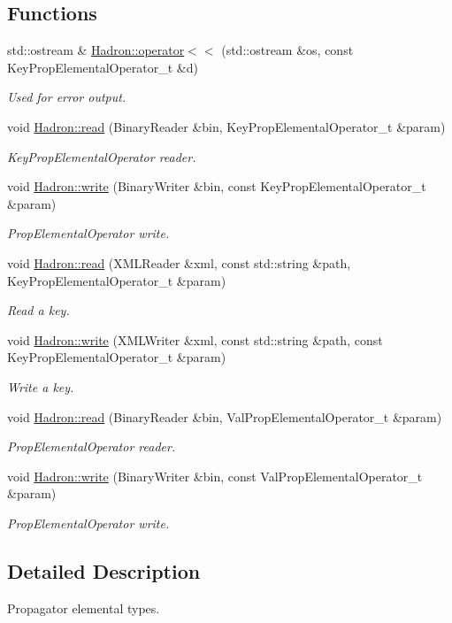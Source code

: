 \subsection*{Functions}
\begin{DoxyCompactItemize}
\item 
std\+::ostream \& \mbox{\hyperlink{namespaceHadron_a8fafc13cc7955fdf6c70c8c72c7b0000}{Hadron\+::operator$<$$<$}} (std\+::ostream \&os, const Key\+Prop\+Elemental\+Operator\+\_\+t \&d)
\begin{DoxyCompactList}\small\item\em Used for error output. \end{DoxyCompactList}\item 
void \mbox{\hyperlink{namespaceHadron_ac7fbe05fdb59de181eed9428364667e3}{Hadron\+::read}} (Binary\+Reader \&bin, Key\+Prop\+Elemental\+Operator\+\_\+t \&param)
\begin{DoxyCompactList}\small\item\em Key\+Prop\+Elemental\+Operator reader. \end{DoxyCompactList}\item 
void \mbox{\hyperlink{namespaceHadron_a2d77dd144d88ef6a060cca397fb32373}{Hadron\+::write}} (Binary\+Writer \&bin, const Key\+Prop\+Elemental\+Operator\+\_\+t \&param)
\begin{DoxyCompactList}\small\item\em Prop\+Elemental\+Operator write. \end{DoxyCompactList}\item 
void \mbox{\hyperlink{namespaceHadron_a3b1642acb606c69519cf7dd88a01fbfd}{Hadron\+::read}} (X\+M\+L\+Reader \&xml, const std\+::string \&path, Key\+Prop\+Elemental\+Operator\+\_\+t \&param)
\begin{DoxyCompactList}\small\item\em Read a key. \end{DoxyCompactList}\item 
void \mbox{\hyperlink{namespaceHadron_a97758f7d26a76e70e4c61d4409eff7a6}{Hadron\+::write}} (X\+M\+L\+Writer \&xml, const std\+::string \&path, const Key\+Prop\+Elemental\+Operator\+\_\+t \&param)
\begin{DoxyCompactList}\small\item\em Write a key. \end{DoxyCompactList}\item 
void \mbox{\hyperlink{namespaceHadron_aa192df4bf85988ad36b7c9b7c0c83dd3}{Hadron\+::read}} (Binary\+Reader \&bin, Val\+Prop\+Elemental\+Operator\+\_\+t \&param)
\begin{DoxyCompactList}\small\item\em Prop\+Elemental\+Operator reader. \end{DoxyCompactList}\item 
void \mbox{\hyperlink{namespaceHadron_a4e777dd6c1ccf60b80a383fd5901627b}{Hadron\+::write}} (Binary\+Writer \&bin, const Val\+Prop\+Elemental\+Operator\+\_\+t \&param)
\begin{DoxyCompactList}\small\item\em Prop\+Elemental\+Operator write. \end{DoxyCompactList}\end{DoxyCompactItemize}


\subsection{Detailed Description}
Propagator elemental types. 

